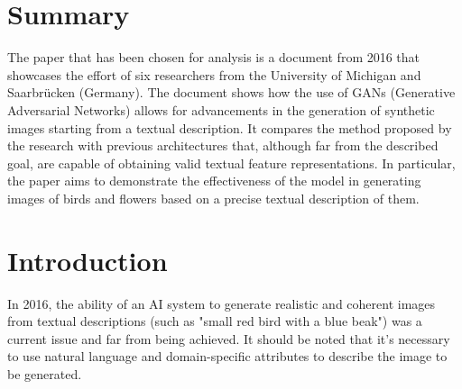 \section*{Summary}

The paper that has been chosen for analysis is a document from 2016 
that showcases the effort of six researchers from the University of 
Michigan and Saarbrücken (Germany). 
The document shows how the use of GANs (Generative Adversarial Networks) 
allows for advancements in the generation of synthetic images starting 
from a textual description. 
It compares the method proposed by the research with previous architectures
that, although far from the described goal, are capable of obtaining 
valid textual feature representations. 
In particular, the paper aims to demonstrate the effectiveness of 
the model in generating images of birds and flowers based on a precise 
textual description of them.

\section*{Introduction}

In 2016, the ability of an AI system to generate realistic and 
coherent images from textual descriptions 
(such as "small red bird with a blue beak") was a current issue and 
far from being achieved.
It should be noted that it's necessary to use natural language 
and domain-specific attributes to describe the image to be generated.


